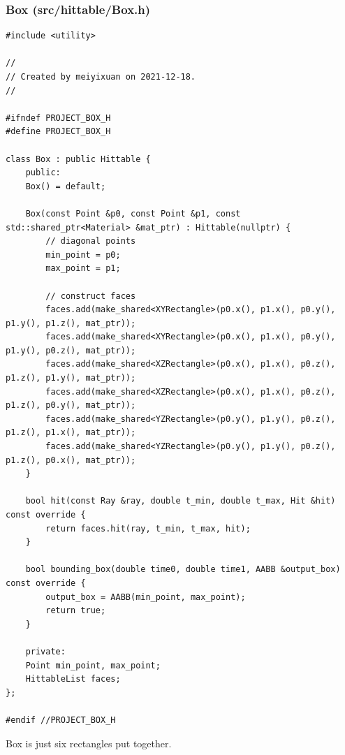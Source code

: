 \documentclass[utf8]{article}
\begin{document}
\subsubsection{Box (src/hittable/Box.h)}
\begin{lstlisting}[style=CStyle]
#include <utility>

//
// Created by meiyixuan on 2021-12-18.
//

#ifndef PROJECT_BOX_H
#define PROJECT_BOX_H

class Box : public Hittable {
	public:
	Box() = default;
	
	Box(const Point &p0, const Point &p1, const std::shared_ptr<Material> &mat_ptr) : Hittable(nullptr) {
		// diagonal points
		min_point = p0;
		max_point = p1;
		
		// construct faces
		faces.add(make_shared<XYRectangle>(p0.x(), p1.x(), p0.y(), p1.y(), p1.z(), mat_ptr));
		faces.add(make_shared<XYRectangle>(p0.x(), p1.x(), p0.y(), p1.y(), p0.z(), mat_ptr));
		faces.add(make_shared<XZRectangle>(p0.x(), p1.x(), p0.z(), p1.z(), p1.y(), mat_ptr));
		faces.add(make_shared<XZRectangle>(p0.x(), p1.x(), p0.z(), p1.z(), p0.y(), mat_ptr));
		faces.add(make_shared<YZRectangle>(p0.y(), p1.y(), p0.z(), p1.z(), p1.x(), mat_ptr));
		faces.add(make_shared<YZRectangle>(p0.y(), p1.y(), p0.z(), p1.z(), p0.x(), mat_ptr));
	}
	
	bool hit(const Ray &ray, double t_min, double t_max, Hit &hit) const override {
		return faces.hit(ray, t_min, t_max, hit);
	}
	
	bool bounding_box(double time0, double time1, AABB &output_box) const override {
		output_box = AABB(min_point, max_point);
		return true;
	}
	
	private:
	Point min_point, max_point;
	HittableList faces;
};

#endif //PROJECT_BOX_H

\end{lstlisting}
Box is just six rectangles put together.
\end{document}

